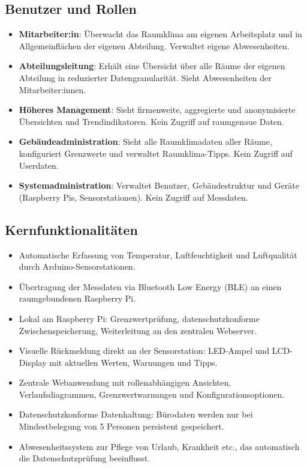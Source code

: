 \documentclass[12pt,a4paper]{article}
\begin{document}
\subsection{Benutzer und Rollen}
\begin{itemize}
  \item \textbf{Mitarbeiter:in}: Überwacht das Raumklima am eigenen Arbeitsplatz und in Allgemeinflächen der eigenen Abteilung. Verwaltet eigene Abwesenheiten.
  \item \textbf{Abteilungsleitung}: Erhält eine Übersicht über alle Räume der eigenen Abteilung in reduzierter Datengranularität. Sieht Abwesenheiten der Mitarbeiter:innen.
  \item \textbf{Höheres Management}: Sieht firmenweite, aggregierte und anonymisierte Übersichten und Trendindikatoren. Kein Zugriff auf raumgenaue Daten.
  \item \textbf{Gebäudeadministration}: Sieht alle Raumklimadaten aller Räume, konfiguriert Grenzwerte und verwaltet Raumklima-Tipps. Kein Zugriff auf Userdaten.
  \item \textbf{Systemadministration}: Verwaltet Benutzer, Gebäudestruktur und Geräte (Raspberry Pis, Sensorstationen). Kein Zugriff auf Messdaten.
\end{itemize}

\subsection{Kernfunktionalitäten}
\begin{itemize}
  \item Automatische Erfassung von Temperatur, Luftfeuchtigkeit und Luftqualität durch Arduino-Sensorstationen.
  \item Übertragung der Messdaten via Bluetooth Low Energy (BLE) an einen raumgebundenen Raspberry Pi.
  \item Lokal am Raspberry Pi: Grenzwertprüfung, datenschutzkonforme Zwischenspeicherung, Weiterleitung an den zentralen Webserver.
  \item Visuelle Rückmeldung direkt an der Sensorstation: LED-Ampel und LCD-Display mit aktuellen Werten, Warnungen und Tipps.
  \item Zentrale Webanwendung mit rollenabhängigen Ansichten, Verlaufsdiagrammen, Grenzwertwarnungen und Konfigurationsoptionen.
  \item Datenschutzkonforme Datenhaltung: Bürodaten werden nur bei Mindestbelegung von 5 Personen persistent gespeichert.
  \item Abwesenheitssystem zur Pflege von Urlaub, Krankheit etc., das automatisch die Datenschutzprüfung beeinflusst.
\end{itemize}
\end{document}
